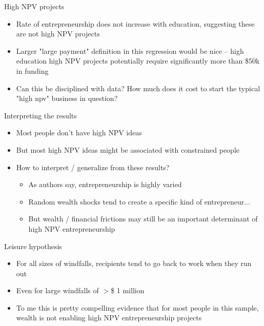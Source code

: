 \documentclass[english,usenames,dvipsnames]{beamer}
\begin{document}
\begin{frame}{High NPV projects}
\begin{itemize}
	\item Rate of entrepreneurship does not increase with education, suggesting these are not high NPV projects
	\item Larger "large payment" definition in this regression would be nice -- high education high NPV projects potentially require significantly more than \$50k in funding
	\item Can this be disciplined with data? How much does it cost to start the typical "high npv" business in question? 
\end{itemize}
\end{frame}

\begin{frame}{Interpreting the results}
\begin{itemize}
	\item Most people don't have high NPV ideas
	\item But most high NPV ideas might be associated with constrained people
	\item How to interpret / generalize from these results?
	\begin{itemize}
		\item As authors say, entrepreneurship is highly varied
		\item Random wealth shocks tend to create a specific kind of entrepreneur...
		\item But wealth / financial frictions may still be an important determinant of high NPV entrepreneurship
	\end{itemize}
\end{itemize}
\end{frame}

\begin{frame}{Leisure hypothesis}
\begin{itemize}
	\item For all sizes of windfalls, recipients tend to go back to work when they run out
	\item Even for large windfalls of $> $\$ 1 million 
	\item To me this is pretty compelling evidence that for most people in this sample, wealth is not enabling high NPV entrepreneurship projects
\end{itemize}
\end{frame}
\end{document}
